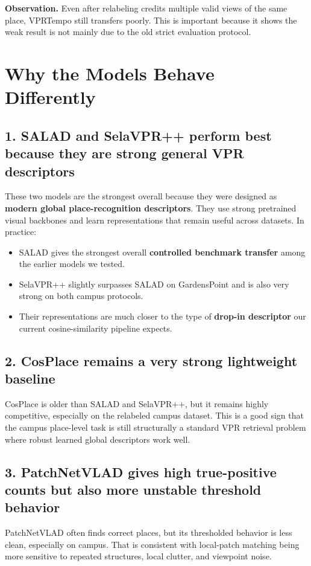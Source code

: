 \documentclass[11pt]{article}
\begin{document}
\textbf{Observation.} Even after relabeling credits multiple valid views of the same place, VPRTempo still transfers poorly. This is important because it shows the weak result is not mainly due to the old strict evaluation protocol.

\section*{Why the Models Behave Differently}
\subsection*{1. SALAD and SelaVPR++ perform best because they are strong general VPR descriptors}
These two models are the strongest overall because they were designed as \textbf{modern global place-recognition descriptors}. They use strong pretrained visual backbones and learn representations that remain useful across datasets. In practice:
\begin{itemize}[leftmargin=*]
  \item SALAD gives the strongest overall \textbf{controlled benchmark transfer} among the earlier models we tested.
  \item SelaVPR++ slightly surpasses SALAD on GardensPoint and is also very strong on both campus protocols.
  \item Their representations are much closer to the type of \textbf{drop-in descriptor} our current cosine-similarity pipeline expects.
\end{itemize}

\subsection*{2. CosPlace remains a very strong lightweight baseline}
CosPlace is older than SALAD and SelaVPR++, but it remains highly competitive, especially on the relabeled campus dataset. This is a good sign that the campus place-level task is still structurally a standard VPR retrieval problem where robust learned global descriptors work well.

\subsection*{3. PatchNetVLAD gives high true-positive counts but also more unstable threshold behavior}
PatchNetVLAD often finds correct places, but its thresholded behavior is less clean, especially on campus. That is consistent with local-patch matching being more sensitive to repeated structures, local clutter, and viewpoint noise.
\end{document}
